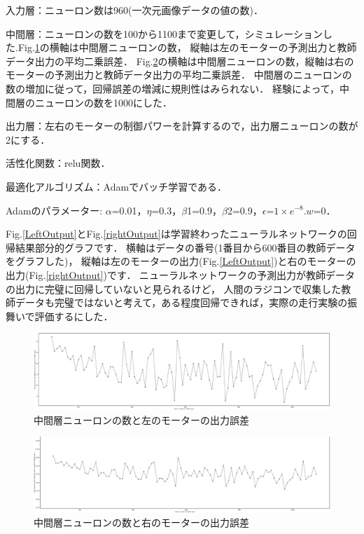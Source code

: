 入力層：ニューロン数は960(一次元画像データの値の数)．

中間層：ニューロンの数を100から1100まで変更して，シミュレーションした.Fig.\ref{anti_left}の横軸は中間層ニューロンの数，
縦軸は左のモーターの予測出力と教師データ出力の平均二乗誤差．
Fig.\ref{anti_right}の横軸は中間層ニューロンの数，縦軸は右のモーターの予測出力と教師データ出力の平均二乗誤差．
中間層のニューロンの数の増加に従って，回帰誤差の増減に規則性はみられない．
経験によって，中間層のニューロンの数を1000にした．

出力層：左右のモーターの制御パワーを計算するので，出力層ニューロンの数が2にする．

活性化関数：relu関数．

最適化アルゴリズム：Adamでバッチ学習である．

Adamのパラメーター: $\alpha$=0.01，$\eta$=0.3，$\beta$1=0.9，$\beta$2=0.9，$\epsilon$=$1\times e^{-8}$.$w$=0．

Fig.\ref{LeftOutput}とFig.\ref{rightOutput}は学習終わったニューラルネットワークの回帰結果部分的グラフです．
横軸はデータの番号(1番目から600番目の教師データをグラフした)，
縦軸は左のモーターの出力(Fig.\ref{LeftOutput})と右のモーターの出力(Fig.\ref{rightOutput})です．
ニューラルネットワークの予測出力が教師データの出力に完璧に回帰していないと見られるけど，
人間のラジコンで収集した教師データも完璧ではないと考えて，ある程度回帰できれば，実際の走行実験の振舞いで評価するにした．

\vspace{-2mm}
\begin{figure}[h]
        \centering
        \includegraphics[width=1.0\linewidth]{anti_left.eps}
        \caption{中間層ニューロンの数と左のモーターの出力誤差}
        \label{anti_left}
\end{figure}
\vspace{-5mm}
\begin{figure}[h]
        \centering
        \includegraphics[width=1.0\linewidth]{anti_right.eps}
        \caption{中間層ニューロンの数と右のモーターの出力誤差}
        \label{anti_right}
\end{figure}

